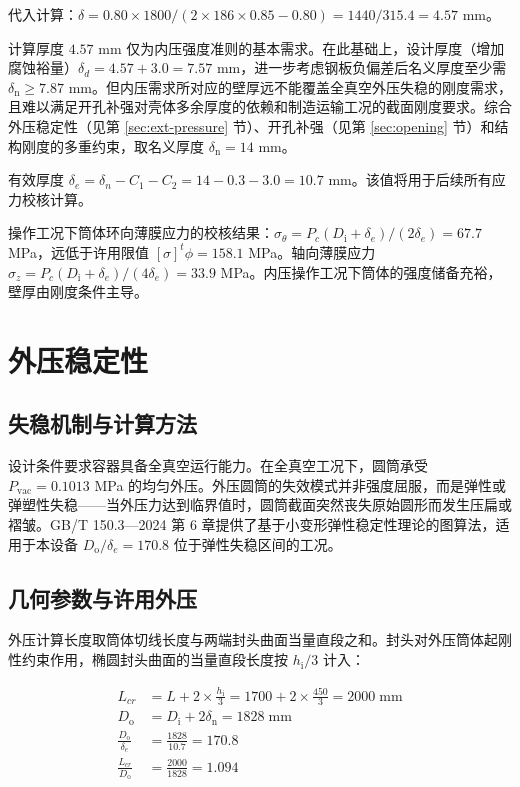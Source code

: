 代入计算：$\delta = 0.80 \times 1800 / (2 \times 186 \times 0.85 - 0.80) = 1440 / 315.4 = 4.57$ mm。

计算厚度 $4.57$ mm 仅为内压强度准则的基本需求。在此基础上，设计厚度（增加腐蚀裕量）$\delta_d = 4.57 + 3.0 = 7.57$ mm，进一步考虑钢板负偏差后名义厚度至少需 $\delta_{\mathrm{n}} \ge 7.87$ mm。但内压需求所对应的壁厚远不能覆盖全真空外压失稳的刚度需求，且难以满足开孔补强对壳体多余厚度的依赖和制造运输工况的截面刚度要求。综合外压稳定性（见第 \ref{sec:ext-pressure} 节）、开孔补强（见第 \ref{sec:opening} 节）和结构刚度的多重约束，取名义厚度 $\delta_{\mathrm{n}} = 14$ mm。

有效厚度 $\delta_e = \delta_n - C_1 - C_2 = 14 - 0.3 - 3.0 = 10.7$ mm。该值将用于后续所有应力校核计算。

操作工况下筒体环向薄膜应力的校核结果：$\sigma_\theta = P_c(D_{\mathrm{i}}+\delta_e)/(2\delta_e) = 67.7$ MPa，远低于许用限值 $[\sigma]^t\phi = 158.1$ MPa。轴向薄膜应力 $\sigma_z = P_c(D_{\mathrm{i}}+\delta_e)/(4\delta_e) = 33.9$ MPa。内压操作工况下筒体的强度储备充裕，壁厚由刚度条件主导。

\section{外压稳定性}

\label{sec:ext-pressure-2}

\subsection{失稳机制与计算方法}

设计条件要求容器具备全真空运行能力。在全真空工况下，圆筒承受 $P_{\mathrm{vac}} = 0.1013$ MPa 的均匀外压。外压圆筒的失效模式并非强度屈服，而是弹性或弹塑性失稳——当外压力达到临界值时，圆筒截面突然丧失原始圆形而发生压扁或褶皱。GB/T 150.3—2024 第 6 章提供了基于小变形弹性稳定性理论的图算法，适用于本设备 $D_{\mathrm{o}}/\delta_e = 170.8$ 位于弹性失稳区间的工况。

\subsection{几何参数与许用外压}

外压计算长度取筒体切线长度与两端封头曲面当量直段之和。封头对外压筒体起刚性约束作用，椭圆封头曲面的当量直段长度按 $h_{\mathrm{i}}/3$ 计入：

\begin{align}
L_{cr} &= L + 2 \times \frac{h_{\mathrm{i}}}{3} = 1700 + 2 \times \frac{450}{3} = 2000 \; \mathrm{mm} \\
D_{\mathrm{o}}    &= D_{\mathrm{i}} + 2\delta_{\mathrm{n}} = 1828 \; \mathrm{mm} \\
\frac{D_{\mathrm{o}}}{\delta_e} &= \frac{1828}{10.7} = 170.8 \\
\frac{L_{cr}}{D_{\mathrm{o}}} &= \frac{2000}{1828} = 1.094
\end{align}


